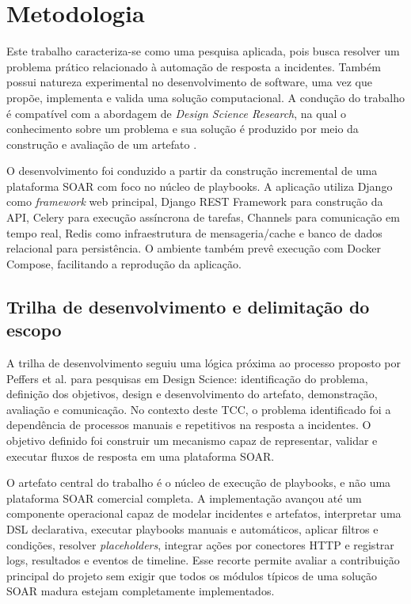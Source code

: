 \documentclass[article,a4paper,12pt,english,brazil,sumario=tradicional]{abntex2}
\begin{document}
\section{Metodologia}

Este trabalho caracteriza-se como uma pesquisa aplicada, pois busca resolver um problema prático relacionado à automação de resposta a incidentes. Também possui natureza experimental no desenvolvimento de software, uma vez que propõe, implementa e valida uma solução computacional. A condução do trabalho é compatível com a abordagem de \textit{Design Science Research}, na qual o conhecimento sobre um problema e sua solução é produzido por meio da construção e avaliação de um artefato \cite{hevner2004}.

O desenvolvimento foi conduzido a partir da construção incremental de uma plataforma SOAR com foco no núcleo de playbooks. A aplicação utiliza Django como \textit{framework} web principal, Django REST Framework para construção da API, Celery para execução assíncrona de tarefas, Channels para comunicação em tempo real, Redis como infraestrutura de mensageria/cache e banco de dados relacional para persistência. O ambiente também prevê execução com Docker Compose, facilitando a reprodução da aplicação.

\subsection{Trilha de desenvolvimento e delimitação do escopo}

A trilha de desenvolvimento seguiu uma lógica próxima ao processo proposto por Peffers et al. \cite{peffers2007} para pesquisas em Design Science: identificação do problema, definição dos objetivos, design e desenvolvimento do artefato, demonstração, avaliação e comunicação. No contexto deste TCC, o problema identificado foi a dependência de processos manuais e repetitivos na resposta a incidentes. O objetivo definido foi construir um mecanismo capaz de representar, validar e executar fluxos de resposta em uma plataforma SOAR.

O artefato central do trabalho é o núcleo de execução de playbooks, e não uma plataforma SOAR comercial completa. A implementação avançou até um componente operacional capaz de modelar incidentes e artefatos, interpretar uma DSL declarativa, executar playbooks manuais e automáticos, aplicar filtros e condições, resolver \textit{placeholders}, integrar ações por conectores HTTP e registrar logs, resultados e eventos de timeline. Esse recorte permite avaliar a contribuição principal do projeto sem exigir que todos os módulos típicos de uma solução SOAR madura estejam completamente implementados.
\end{document}
